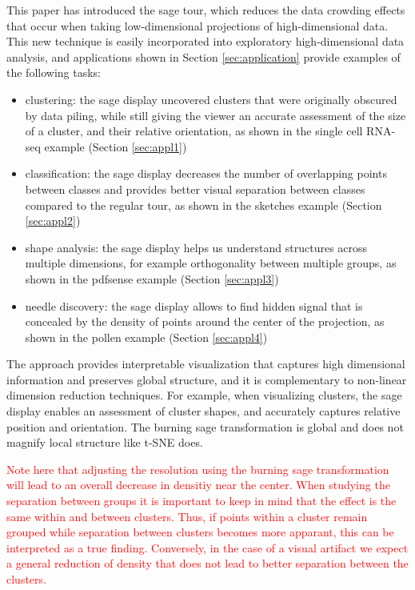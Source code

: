 \documentclass[]{interact}
\theoremstyle{plain}%
\theoremstyle{definition}
\theoremstyle{remark}
\def\tightlist{}
\begin{document}
This paper has introduced the sage tour, which reduces the data crowding
effects that occur when taking low-dimensional projections of
high-dimensional data. This new technique is easily incorporated into
exploratory high-dimensional data analysis, and applications shown in
Section \ref{sec:application} provide examples of the following tasks:

\begin{itemize}
\tightlist
\item
  clustering: the sage display uncovered clusters that were originally
  obscured by data piling, while still giving the viewer an accurate
  assessment of the size of a cluster, and their relative orientation,
  as shown in the single cell RNA-seq example (Section \ref{sec:appl1})
\item
  classification: the sage display decreases the number of overlapping
  points between classes and provides better visual separation between
  classes compared to the regular tour, as shown in the sketches example
  (Section \ref{sec:appl2})
\item
  shape analysis: the sage display helps us understand structures across
  multiple dimensions, for example orthogonality between multiple
  groups, as shown in the pdfsense example (Section \ref{sec:appl3})
\item
  needle discovery: the sage display allows to find hidden signal that
  is concealed by the density of points around the center of the
  projection, as shown in the pollen example (Section \ref{sec:appl4})
\end{itemize}

The approach provides interpretable visualization that captures high
dimensional information and preserves global structure, and it is
complementary to non-linear dimension reduction techniques. For example,
when visualizing clusters, the sage display enables an assessment of
cluster shapes, and accurately captures relative position and
orientation. The burning sage transformation is global and does not
magnify local structure like t-SNE does.

\textcolor{red}{Note here that adjusting the resolution using the burning sage transformation will lead to an overall decrease in densitiy near the center. When studying the separation between groups it is important to keep in mind that the effect is the same within and between clusters. Thus, if points within a cluster remain grouped while separation between clusters becomes more apparant, this can be interpreted as a true finding. Conversely, in the case of a visual artifact we expect a general reduction of density that does not lead to better separation between the clusters.}
\end{document}
